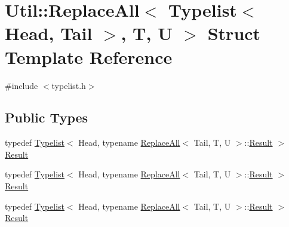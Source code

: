 \hypertarget{structUtil_1_1TL_1_1ReplaceAll_3_01Typelist_3_01Head_00_01Tail_01_4_00_01T_00_01U_01_4}{}\section{Util\+:\+:Replace\+All$<$ Typelist$<$ Head, Tail $>$, T, U $>$ Struct Template Reference}
\label{structUtil_1_1TL_1_1ReplaceAll_3_01Typelist_3_01Head_00_01Tail_01_4_00_01T_00_01U_01_4}


{\ttfamily \#include $<$typelist.\+h$>$}

\subsection*{Public Types}
\begin{DoxyCompactItemize}
\item 
typedef \mbox{\hyperlink{structUtil_1_1Typelist}{Typelist}}$<$ Head, typename \mbox{\hyperlink{structUtil_1_1TL_1_1ReplaceAll}{Replace\+All}}$<$ Tail, T, U $>$\+::\mbox{\hyperlink{structUtil_1_1TL_1_1ReplaceAll_3_01Typelist_3_01Head_00_01Tail_01_4_00_01T_00_01U_01_4_ae088fac6604aa56701fce6cb8b402178}{Result}} $>$ \mbox{\hyperlink{structUtil_1_1TL_1_1ReplaceAll_3_01Typelist_3_01Head_00_01Tail_01_4_00_01T_00_01U_01_4_ae088fac6604aa56701fce6cb8b402178}{Result}}
\item 
typedef \mbox{\hyperlink{structUtil_1_1Typelist}{Typelist}}$<$ Head, typename \mbox{\hyperlink{structUtil_1_1TL_1_1ReplaceAll}{Replace\+All}}$<$ Tail, T, U $>$\+::\mbox{\hyperlink{structUtil_1_1TL_1_1ReplaceAll_3_01Typelist_3_01Head_00_01Tail_01_4_00_01T_00_01U_01_4_ae088fac6604aa56701fce6cb8b402178}{Result}} $>$ \mbox{\hyperlink{structUtil_1_1TL_1_1ReplaceAll_3_01Typelist_3_01Head_00_01Tail_01_4_00_01T_00_01U_01_4_ae088fac6604aa56701fce6cb8b402178}{Result}}
\item 
typedef \mbox{\hyperlink{structUtil_1_1Typelist}{Typelist}}$<$ Head, typename \mbox{\hyperlink{structUtil_1_1TL_1_1ReplaceAll}{Replace\+All}}$<$ Tail, T, U $>$\+::\mbox{\hyperlink{structUtil_1_1TL_1_1ReplaceAll_3_01Typelist_3_01Head_00_01Tail_01_4_00_01T_00_01U_01_4_ae088fac6604aa56701fce6cb8b402178}{Result}} $>$ \mbox{\hyperlink{structUtil_1_1TL_1_1ReplaceAll_3_01Typelist_3_01Head_00_01Tail_01_4_00_01T_00_01U_01_4_ae088fac6604aa56701fce6cb8b402178}{Result}}
\end{DoxyCompactItemize}


